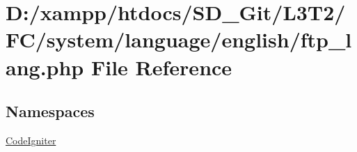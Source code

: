 \hypertarget{system_2language_2english_2ftp__lang_8php}{}\section{D\+:/xampp/htdocs/\+S\+D\+\_\+\+Git/\+L3\+T2/\+F\+C/system/language/english/ftp\+\_\+lang.php File Reference}
\label{system_2language_2english_2ftp__lang_8php}
\subsection*{Namespaces}
\begin{DoxyCompactItemize}
\item 
 \hyperlink{namespace_code_igniter}{Code\+Igniter}
\end{DoxyCompactItemize}

